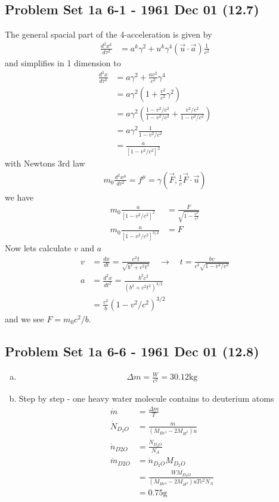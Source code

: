 \documentclass[../main.tex]{subfiles}
\begin{document}
\subsection{Problem Set 1a 6-1 - 1961 Dec 01 (12.7)}
The general spacial part of the 4-acceleration is given by
\begin{align}
\frac{d^2x^k}{d\tau^2}
&=a^k\gamma^2+u^k\gamma^4(\vec{u}\cdot\vec{a})\frac{1}{c^2}
\end{align}
and simplifies in 1 dimension to
\begin{align}
\frac{d^2x}{d\tau^2}
&=a\gamma^2+\frac{av^2}{c^2}\gamma^4\\
&=a\gamma^2\left(1+\frac{v^2}{c^2}\gamma^2\right)\\
&=a\gamma^2\left(\frac{1-v^2/c^2}{1-v^2/c^2}+\frac{v^2/c^2}{1-v^2/c^2}\right)\\
&=a\gamma^2\frac{1}{1-v^2/c^2}\\
&=\frac{a}{[1-v^2/c^2]^2}
\end{align}
with Newtons 3rd law
\begin{align}
m_0\frac{d^2x^\mu}{d\tau^2}=f^\mu=\gamma(\vec{F},\frac{1}{c}\vec{F}\cdot\vec{u})
\end{align}
we have
\begin{align}
m_0\frac{a}{[1-v^2/c^2]^2}&=\frac{F}{\sqrt{1-\frac{v^2}{c^2}}}\\
m_0\frac{a}{[1-v^2/c^2]^{3/2}}&=F
\end{align}
Now lets calculate $v$ and $a$
\begin{align}
v&=\frac{dx}{dt}=\frac{c^2t}{\sqrt{b^2+c^2t^2}}\quad\rightarrow\quad t=\frac{bv}{c^2\sqrt{1-v^2/c^2}}\\
a&=\frac{d^2x}{dt^2}=\frac{b^2c^2}{(b^2+c^2t^2)^{3/2}}\\
&=\frac{c^2}{b}(1-v^2/c^2)^{3/2}
\end{align}
and we see $F=m_0c^2/b$.

\subsection{Problem Set 1a 6-6 - 1961 Dec 01 (12.8)}
\begin{enumerate}[a)]
\item
\begin{align}
\Delta m=\frac{W}{c^2}=30.12\text{kg}
\end{align}

\item Step by step - one heavy water molecule contains to deuterium atoms
\begin{align}
\dot{m}&=\frac{\Delta m}{T}\\
\dot{N}_{D_2O}&=\frac{\dot{m}}{(M_{He^4}-2M_{H^2})u}\\
\dot{n}_{D2O}&=\frac{\dot{N}_{D_2O}}{N_A}\\
\dot{m}_{D2O}&=\dot{n}_{D_2O}M_{D_2O}\\
&=\frac{WM_{D_2O}}{(M_{He^4}-2M_{H^2})uTc^2N_A}\\
&=0.75\text{g}
\end{align}
\end{enumerate}
\end{document}
